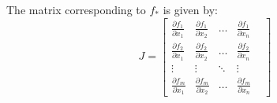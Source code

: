 \documentclass{book}                                                            %
\begin{document}
                The matrix corresponding to $f_{*}$ is given by:
                \begingroup
                    \renewcommand*{\arraystretch}{1.5}
                    \begin{equation}
                        J=
                        \begin{bmatrix}
                            \frac{\partial{f}_{1}}{\partial{x}_{1}}&
                            \frac{\partial{f}_{1}}{\partial{x}_{2}}
                            &\dots&
                            \frac{\partial{f}_{1}}{\partial{x}_{n}}\\
                            \frac{\partial{f}_{2}}{\partial{x}_{1}}&
                            \frac{\partial{f}_{2}}{\partial{x}_{2}}
                            &\dots&
                            \frac{\partial{f}_{2}}{\partial{x}_{n}}\\
                            \vdots&\vdots&\ddots&\vdots&\\
                            \frac{\partial{f}_{m}}{\partial{x}_{1}}&
                            \frac{\partial{f}_{m}}{\partial{x}_{2}}
                            &\dots&
                            \frac{\partial{f}_{m}}{\partial{x}_{n}}
                        \end{bmatrix}
                    \end{equation}
                \endgroup
\end{document}
